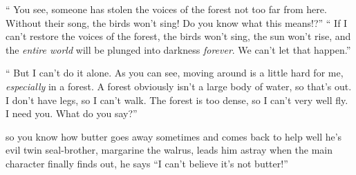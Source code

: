 \documentclass{article}
\begin{document}
\enquote{%
  You see, someone has stolen
  the voices of the forest
  not too far from here.
  Without their song, the birds won't sing!
  Do you know what this means!?}
\enquote{%
  If I can't restore the
  voices of the forest,
  the birds won't sing,
  the sun won't rise,
  and the \emph{entire world} will be
  plunged into darkness \emph{forever}.
  We can't let that happen.}

\enquote{%
  But I can't do it alone.
  As you can see, moving around is a little hard for me, \emph{especially} in a forest.
  A forest obviously isn't a large body of water, so that's out.
  I don't have legs, so I can't walk.
  The forest is too dense, so I can't very well fly.
  I need you.
  What do you say?}


\vfill


\vfill

\newpage

so you know how butter goes away sometimes and comes back to help 
well
he's evil twin seal-brother, margarine the walrus, leads him astray
when the main character finally finds out, he says \enquote{I can't believe it's not butter!}
\end{document}

